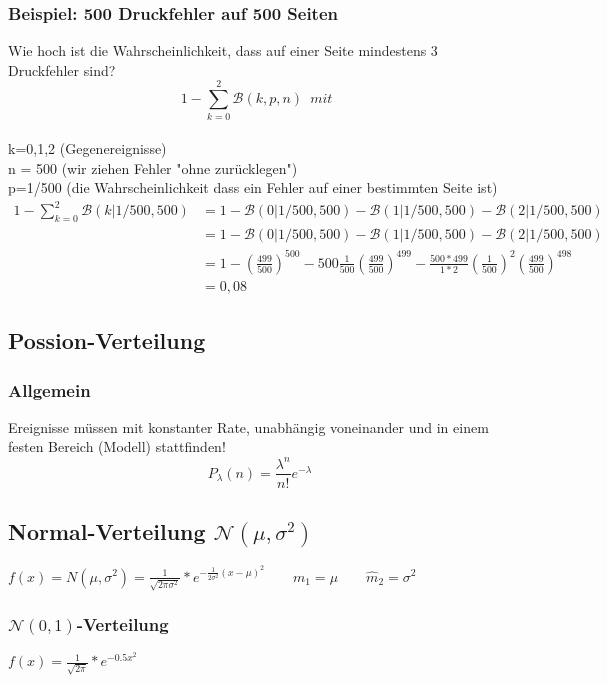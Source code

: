 \documentclass{article}
\begin{document}
\subsubsection{Beispiel: 500 Druckfehler auf 500 Seiten}
Wie hoch ist die Wahrscheinlichkeit, dass auf einer Seite mindestens 3 Druckfehler
sind?
\[
1- \sum_{k=0}^{2} \mathcal{B}(k,p,n) \enspace mit \enspace \] \\
k=0,1,2 (Gegenereignisse)\\ n = 500
(wir ziehen Fehler "ohne zur\"ucklegen") \\ p=1/500 (die Wahrscheinlichkeit dass
ein Fehler auf einer bestimmten Seite ist)\\
\begin{equation*}
	\begin{split}
		1- \sum_{k=0}^{2} \mathcal{B}(k|1/500,500)& = 1 - \mathcal{B}(0|1/500,500) - \mathcal{B}(1|1/500,500) - \mathcal{B}(2|
		1/500,500) \\
		& = 1 -  \mathcal{B}(0|1/500,500) - \mathcal{B}(1|1/500,500) - \mathcal{B}(2|
		1/500,500) \\
		& = 1 - \left( \frac{499}{500} \right) ^{500} - 500\frac{1}{500}\left(\frac{499}{500}\right)^{499} - \frac{500*499}{1*2}\left( \frac{1}{500} \right) ^2 \left( \frac{499}{500} \right) ^{498} \\ & = 0,08
	\end{split}
\end{equation*}
\subsection{Possion-Verteilung}
\subsubsection{Allgemein}
Ereignisse m\"ussen mit konstanter Rate, unabh\"angig voneinander und in einem festen 
Bereich (Modell) stattfinden!
\[
	P_{\lambda}(n) = \frac{\lambda ^n}{n!} e ^{- \lambda}
\]
\subsection{Normal-Verteilung $\mathcal{N}(\mu, \sigma^2)$}
$f(x) = N(\mu, \sigma^2) = \frac{1}{\sqrt{2\pi\sigma^2}}*e^{-\frac{1}{2\sigma^2}(x-		
\mu)^2} \quad \quad m_1 = \mu \quad \quad \widehat{m}_2=\sigma^2$
\subsubsection{$\mathcal{N}(0,1)$-Verteilung}
$f(x) = \frac{1}{\sqrt{2\pi}}*e^{-0.5x^2}$
\end{document}
